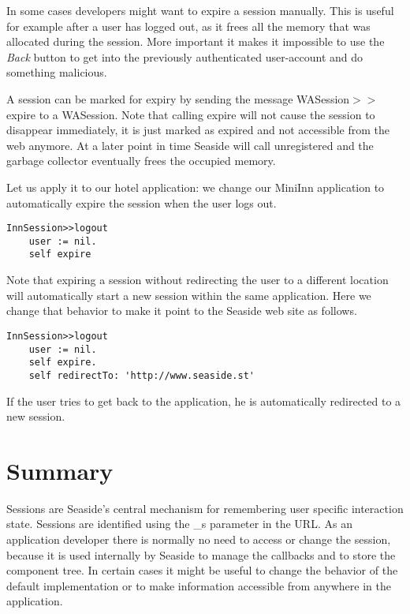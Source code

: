\documentclass[a4paper,10pt,twoside]{book}
\newcommand{\ct}[1]{{\small\ttfamily\textup{#1}}}
\begin{document}
In some cases developers might want to expire a session manually. This is useful for example after a user has logged out, as it frees all the memory that was allocated during the session. More important it makes
it impossible to use the \textit{Back} button to get into the previously authenticated user-account and do something malicious.

A session can be marked for expiry by sending the message \ct{WASession$>$$>$expire}  to a \ct{WASession}.  Note that calling \ct{expire} will not cause the session to disappear immediately, it is just marked as expired  and not accessible from the web anymore. At a later point in time Seaside will call \ct{unregistered} and the garbage collector eventually frees the occupied memory.

Let us apply it to our hotel application: we change our MiniInn application to automatically expire the session when the user logs out.

\begin{lstlisting}
InnSession>>logout
    user := nil.
    self expire
\end{lstlisting}

Note that expiring a session without redirecting the user to a different location will automatically start a new session within the same application. Here we change that behavior to make it point to the Seaside web site as follows.

\begin{lstlisting}
InnSession>>logout
    user := nil.
    self expire.
    self redirectTo: 'http://www.seaside.st'
\end{lstlisting}

If the user tries to get back to the application, he is automatically redirected to a new session.

\section{Summary}
\label{book:inaction:session:summary}

Sessions are Seaside's central mechanism for remembering user specific interaction state. Sessions are identified using the \ct{\_s} parameter in the URL. As an application developer there is normally no need to access or change the session, because it is used internally by Seaside to manage the callbacks and to store the component tree. In certain cases it might be useful to change the behavior of the default implementation or to make information accessible from anywhere in the application.
\end{document}
